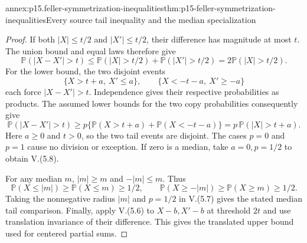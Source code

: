 \begin{annexitem}{annex:p15.feller-symmetrization-inequalities}{thm:p15-feller-symmetrization-inequalities}{Every source tail inequality and the median specialization}
\begin{proof}
If both \(|X|\leq t/2\) and \(|X'|\leq t/2\), their
difference has magnitude at most \(t\). The union bound and equal
laws therefore give
\[
 \mathbb P(|X-X'|>t)
 \leq\mathbb P(|X|>t/2)+\mathbb P(|X'|>t/2)
 =2\mathbb P(|X|>t/2).
\]
For the lower bound, the two disjoint events
\[
 \{X>t+a,\ X'\leq a\},\qquad
 \{X<-t-a,\ X'\geq-a\}
\]
each force \(|X-X'|>t\). Independence gives their respective
probabilities as products. The assumed lower bounds for the two
copy probabilities consequently give
\[
 \mathbb P(|X-X'|>t)
 \geq p\{\mathbb P(X>t+a)+\mathbb P(X<-t-a)\}
 =p\,\mathbb P(|X|>t+a).
\]
Here \(a\geq0\) and \(t>0\), so the two tail events are disjoint.
The cases \(p=0\) and \(p=1\) cause no division or exception.
If zero is a median, take \(a=0,p=1/2\) to obtain V.(5.8).

For any median \(m\), \(|m|\geq m\) and \(-|m|\leq m\).
Thus
\[
 \mathbb P(X\leq|m|)\geq\mathbb P(X\leq m)\geq1/2,\qquad
 \mathbb P(X\geq-|m|)\geq\mathbb P(X\geq m)\geq1/2.
\]
Taking the nonnegative radius \(|m|\) and \(p=1/2\) in V.(5.7)
gives the stated median tail comparison. Finally, apply V.(5.6)
to \(X-b,X'-b\) at threshold \(2t\) and use translation
invariance of their difference. This gives the translated upper
bound used for centered partial sums.
\end{proof}
\end{annexitem}

